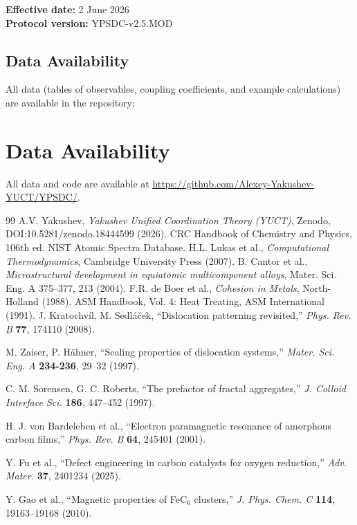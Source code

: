 \documentclass[12pt,a4paper]{article}
\begin{document}
	\vspace{0.3cm}
	\noindent \textbf{Effective date:} 2 June 2026 \\
	\textbf{Protocol version:} YPSDC-v2.5.MOD
	
	
	\subsection{Data Availability}
	
	All data (tables of observables, coupling coefficients, and example calculations) are available in the repository:
	
	\newpage
	\section*{Data Availability}
	All data and code are available at \url{https://github.com/Alexey-Yakushev-YUCT/YPSDC/}.
	
	\begin{thebibliography}{99}
		 A.V. Yakushev, \emph{Yakushev Unified Coordination Theory (YUCT)}, Zenodo, DOI:10.5281/zenodo.18444599 (2026).
		 CRC Handbook of Chemistry and Physics, 106th ed.
		 NIST Atomic Spectra Database.
		 H.L. Lukas et al., \emph{Computational Thermodynamics}, Cambridge University Press (2007).
		 B. Cantor et al., \emph{Microstructural development in equiatomic multicomponent alloys}, Mater. Sci. Eng. A 375–377, 213 (2004).
		 F.R. de Boer et al., \emph{Cohesion in Metals}, North-Holland (1988).
		 ASM Handbook, Vol. 4: Heat Treating, ASM International (1991).
		J. Kratochv\'il, M. Sedl\'a\v{c}ek, ``Dislocation patterning revisited,'' \emph{Phys. Rev. B} \textbf{77}, 174110 (2008).
		
		M. Zaiser, P. H\"ahner, ``Scaling properties of dislocation systems,'' \emph{Mater. Sci. Eng. A} \textbf{234-236}, 29–32 (1997).
		
		C. M. Sorensen, G. C. Roberts, ``The prefactor of fractal aggregates,'' \emph{J. Colloid Interface Sci.} \textbf{186}, 447–452 (1997).
		
		H. J. von Bardeleben et al., ``Electron paramagnetic resonance of amorphous carbon films,'' \emph{Phys. Rev. B} \textbf{64}, 245401 (2001).
		
		Y. Fu et al., ``Defect engineering in carbon catalysts for oxygen reduction,'' \emph{Adv. Mater.} \textbf{37}, 2401234 (2025).
		
		Y. Gao et al., ``Magnetic properties of FeC$_6$ clusters,'' \emph{J. Phys. Chem. C} \textbf{114}, 19163–19168 (2010).
	\end{thebibliography}
	
\end{document}
